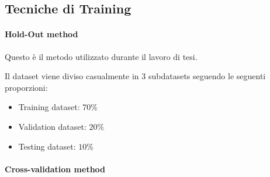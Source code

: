     \subsection{Tecniche di Training}
            \paragraph{Hold-Out method}
            \label{Hold-Out method}
            Questo è il metodo utilizzato durante il lavoro di tesi.
            
            Il dataset viene diviso casualmente in 3 subdatasets seguendo le seguenti proporzioni:
                \begin{itemize}
                    \item Training dataset: $70\%$
                    \item Validation dataset: $20\%$
                    \item Testing dataset: $10\%$
                \end{itemize}
            
            \paragraph{Cross-validation method}
            
